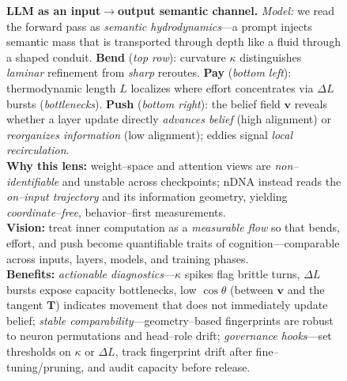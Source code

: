 \documentclass[11pt]{article}
\begin{document}
\begin{figure}[t]
  \caption{\textbf{LLM as an input$\to$output semantic channel.}
\emph{Model:} we read the forward pass as \emph{semantic hydrodynamics}—a prompt injects semantic mass that is transported through depth like a fluid through a shaped conduit.
\textbf{Bend} (\emph{top row}): curvature $\kappa$ distinguishes \emph{laminar} refinement from \emph{sharp} reroutes.
\textbf{Pay} (\emph{bottom left}): thermodynamic length $L$ localizes where effort concentrates via $\Delta L$ bursts (\emph{bottlenecks}).
\textbf{Push} (\emph{bottom right}): the belief field $\mathbf{v}$ reveals whether a layer update directly \emph{advances belief} (high alignment) or \emph{reorganizes information} (low alignment); eddies signal \emph{local recirculation}.\\
\textbf{Why this lens:} weight--space and attention views are \emph{non--identifiable} and unstable across checkpoints; nDNA instead reads the \emph{on--input trajectory} and its information geometry, yielding \emph{coordinate--free}, behavior--first measurements.\\
\textbf{Vision:} treat inner computation as a \emph{measurable flow} so that bends, effort, and push become quantifiable traits of cognition—comparable across inputs, layers, models, and training phases.\\
\textbf{Benefits:} \emph{actionable diagnostics}—$\kappa$ spikes flag brittle turns, $\Delta L$ bursts expose capacity bottlenecks, low $\cos\theta$ (between $\mathbf{v}$ and the tangent $\mathbf{T}$) indicates movement that does not immediately update belief; \emph{stable comparability}—geometry--based fingerprints are robust to neuron permutations and head--role drift; \emph{governance hooks}—set thresholds on $\kappa$ or $\Delta L$, track fingerprint drift after fine--tuning/pruning, and audit capacity before release.}
  \label{fig:ndna_semantic_flow_minipage}
\end{figure}
\end{document}
